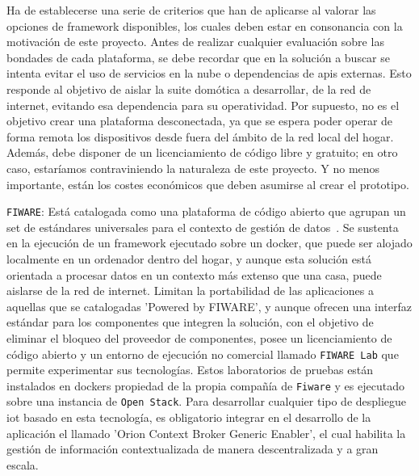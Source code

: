 Ha de establecerse una serie de criterios que han de aplicarse al valorar las opciones de \gls{framework} disponibles, los cuales deben estar en consonancia con la motivación de este proyecto. Antes de realizar cualquier evaluación sobre las bondades de cada plataforma, se debe recordar que en la solución a buscar se intenta evitar el uso de servicios en la nube o dependencias de \gls{api}s externas. Esto responde al objetivo de aislar la suite domótica a desarrollar, de la red de internet, evitando esa dependencia para su operatividad. Por supuesto, no es el objetivo crear una plataforma desconectada, ya que se espera poder operar de forma remota los dispositivos desde fuera del ámbito de la red local del hogar. Además, debe disponer de un licenciamiento de código libre y gratuito; en otro caso, estaríamos contraviniendo la naturaleza de este proyecto. Y no menos importante, están los costes económicos que deben asumirse al crear el prototipo.

\vspace{1cm}

\verb|FIWARE|: Está catalogada como una plataforma de código abierto que agrupan un set de estándares universales para el contexto de gestión de datos~\cite{whatisfiware}. Se sustenta en la ejecución de un \gls{framework} ejecutado sobre un \gls{docker}, que puede ser alojado localmente en un ordenador dentro del hogar, y aunque esta solución está orientada a procesar datos en un contexto más extenso que una casa, puede aislarse de la red de internet. Limitan la portabilidad de las aplicaciones a aquellas que se catalogadas 'Powered by FIWARE', y aunque ofrecen una interfaz estándar para los componentes que integren la solución, con el objetivo de eliminar el bloqueo del proveedor de componentes, posee un licenciamiento de código abierto y un entorno de ejecución no comercial llamado \verb|FIWARE Lab| que permite experimentar sus tecnologías. Estos laboratorios de pruebas están instalados en \gls{docker}s propiedad de la propia compañía de \verb|Fiware| y es ejecutado sobre una instancia de \verb|Open Stack|. Para desarrollar cualquier tipo de despliegue \gls{iot} basado en esta tecnología, es obligatorio integrar en el desarrollo de la aplicación el llamado 'Orion Context Broker Generic Enabler', el cual habilita la gestión de información contextualizada de manera descentralizada y a gran escala.

